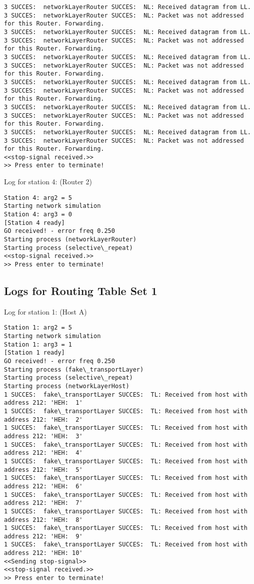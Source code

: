 \begin{lstlisting}[breaklines=true]
3 SUCCES:  networkLayerRouter SUCCES:  NL: Received datagram from LL.
3 SUCCES:  networkLayerRouter SUCCES:  NL: Packet was not addressed for this Router. Forwarding.
3 SUCCES:  networkLayerRouter SUCCES:  NL: Received datagram from LL.
3 SUCCES:  networkLayerRouter SUCCES:  NL: Packet was not addressed for this Router. Forwarding.
3 SUCCES:  networkLayerRouter SUCCES:  NL: Received datagram from LL.
3 SUCCES:  networkLayerRouter SUCCES:  NL: Packet was not addressed for this Router. Forwarding.
3 SUCCES:  networkLayerRouter SUCCES:  NL: Received datagram from LL.
3 SUCCES:  networkLayerRouter SUCCES:  NL: Packet was not addressed for this Router. Forwarding.
3 SUCCES:  networkLayerRouter SUCCES:  NL: Received datagram from LL.
3 SUCCES:  networkLayerRouter SUCCES:  NL: Packet was not addressed for this Router. Forwarding.
3 SUCCES:  networkLayerRouter SUCCES:  NL: Received datagram from LL.
3 SUCCES:  networkLayerRouter SUCCES:  NL: Packet was not addressed for this Router. Forwarding.
<<stop-signal received.>>
>> Press enter to terminate!
\end{lstlisting}

Log for station 4: (Router 2)
\begin{lstlisting}[breaklines=true]
Station 4: arg2 = 5
Starting network simulation
Station 4: arg3 = 0
[Station 4 ready]
GO received! - error freq 0.250
Starting process (networkLayerRouter)
Starting process (selective\_repeat)
<<stop-signal received.>>
>> Press enter to terminate!
\end{lstlisting}

\subsection{Logs for Routing Table Set 1}
Log for station 1: (Host A)
\begin{lstlisting}[breaklines=true]
Station 1: arg2 = 5
Starting network simulation
Station 1: arg3 = 1
[Station 1 ready]
GO received! - error freq 0.250
Starting process (fake\_transportLayer)
Starting process (selective\_repeat)
Starting process (networkLayerHost)
1 SUCCES:  fake\_transportLayer SUCCES:  TL: Received from host with address 212: 'HEH:  1'
1 SUCCES:  fake\_transportLayer SUCCES:  TL: Received from host with address 212: 'HEH:  2'
1 SUCCES:  fake\_transportLayer SUCCES:  TL: Received from host with address 212: 'HEH:  3'
1 SUCCES:  fake\_transportLayer SUCCES:  TL: Received from host with address 212: 'HEH:  4'
1 SUCCES:  fake\_transportLayer SUCCES:  TL: Received from host with address 212: 'HEH:  5'
1 SUCCES:  fake\_transportLayer SUCCES:  TL: Received from host with address 212: 'HEH:  6'
1 SUCCES:  fake\_transportLayer SUCCES:  TL: Received from host with address 212: 'HEH:  7'
1 SUCCES:  fake\_transportLayer SUCCES:  TL: Received from host with address 212: 'HEH:  8'
1 SUCCES:  fake\_transportLayer SUCCES:  TL: Received from host with address 212: 'HEH:  9'
1 SUCCES:  fake\_transportLayer SUCCES:  TL: Received from host with address 212: 'HEH: 10'
<<Sending stop-signal>>
<<stop-signal received.>>
>> Press enter to terminate!
\end{lstlisting}

